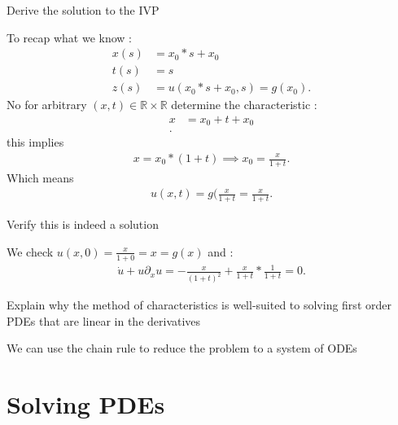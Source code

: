 \begin{question}
 Derive the solution to the IVP 
\end{question}
\begin{solution}
  To recap what we know : 
  \begin{align*}
		x(s) & = x_{0}*s+x_{0} \\
		t(s) & = s     \\ 
    z(s) &= u(x_{0}*s+x_{0},s) = g(x_{0})
  .\end{align*}
No for arbitrary $(x,t) \in \mathbb{R}\times \mathbb{R}$ determine the characteristic :
\begin{align*}
  x &= x_{0}+t +x_{0} \\
.\end{align*}
this implies 
\begin{align*}
 x = x_{0}*(1+t) \implies x_{0} = \frac{x}{1+t}
.\end{align*}
Which means  
\begin{align*}
  u(x,t) = g(\frac{x}{1+t} = \frac{x}{1+t}
.\end{align*}
\end{solution}
\begin{question}
 Verify this is indeed a solution  
\end{question}
\begin{solution}
 We check $u(x,0) = \frac{x}{1+0} = x = g(x)$  and : 
 \begin{align*}
   \dot{u} + u \partial_x u =  - \frac{x}{(1+t)^2}  + \frac{x}{1+t}*\frac{1}{1+t}  = 0
 .\end{align*}
\end{solution}
\begin{question}
 Explain why the method of characteristics is well-suited to solving first order PDEs that are linear in the derivatives 
\end{question}
\begin{solution}
  We can use the chain rule to reduce the problem to a system of ODEs
\end{solution}
\section{Solving PDEs}



